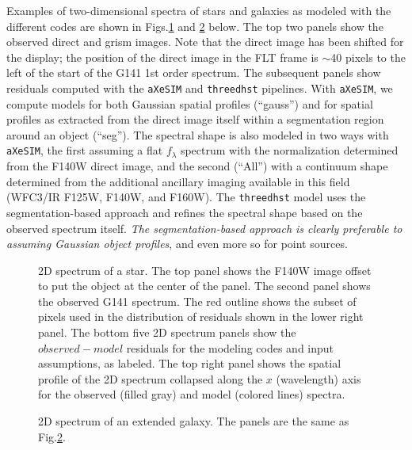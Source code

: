 \documentclass[preprint]{aastex}
\begin{document}
    Examples of two-dimensional spectra of stars and galaxies as modeled with the different codes are shown in Figs.\ref{fig:star2D} and \ref{fig:gal2D} below.  The top two panels show the observed direct and grism images.  Note that the direct image has been shifted for the display; the position of the direct image in the FLT frame is $\sim$40 pixels to the left of the start of the G141 1st order spectrum.  The subsequent panels show residuals computed with the \texttt{aXeSIM} and \texttt{threedhst} pipelines.  With \texttt{aXeSIM}, we compute models for both Gaussian spatial profiles (``gauss'') and for spatial profiles as extracted from the direct image itself within a segmentation region around an object (``seg'').  The spectral shape is also modeled in two ways with \texttt{aXeSIM}, the first assuming a flat $f_\lambda$ spectrum with the normalization determined from the F140W direct image, and the second (``All'') with a continuum shape determined from the additional ancillary imaging available in this field (WFC3/IR F125W, F140W, and F160W).  The \texttt{threedhst} model uses the segmentation-based approach and refines the spectral shape based on the observed spectrum itself.  \textit{The segmentation-based approach is clearly preferable to assuming Gaussian object profiles}, and even more so for point sources.  
    
    
    
\begin{figure}
    \caption{2D spectrum of a star.  The top panel shows the F140W image offset to put the object at the center of the panel.  The second panel shows the observed G141 spectrum.  The red outline shows the subset of pixels used in the distribution of residuals shown in the lower right panel.  The bottom five 2D spectrum panels show the $observed-model$ residuals for the modeling codes and input assumptions, as labeled.  The top right panel shows the spatial profile of the 2D spectrum collapsed along the $x$ (wavelength) axis for the observed (filled gray) and model (colored lines) spectra.}
    \label{fig:star2D}
\end{figure}

\begin{figure}
    \caption{2D spectrum of an extended galaxy.  The panels are the same as Fig.\ref{fig:gal2D}.}
    \label{fig:gal2D}
\end{figure}
\end{document}
